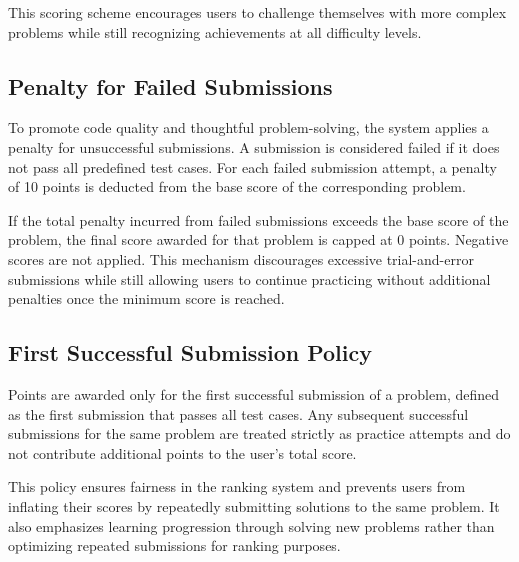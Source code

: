 This scoring scheme encourages users to challenge themselves with more complex problems while still recognizing achievements at all difficulty levels.

\subsection*{Penalty for Failed Submissions}

To promote code quality and thoughtful problem-solving, the system applies a penalty for unsuccessful submissions. A submission is considered failed if it does not pass all predefined test cases. For each failed submission attempt, a penalty of 10 points is deducted from the base score of the corresponding problem.

If the total penalty incurred from failed submissions exceeds the base score of the problem, the final score awarded for that problem is capped at 0 points. Negative scores are not applied. This mechanism discourages excessive trial-and-error submissions while still allowing users to continue practicing without additional penalties once the minimum score is reached.

\subsection*{First Successful Submission Policy}

Points are awarded only for the first successful submission of a problem, defined as the first submission that passes all test cases. Any subsequent successful submissions for the same problem are treated strictly as practice attempts and do not contribute additional points to the user’s total score.

This policy ensures fairness in the ranking system and prevents users from inflating their scores by repeatedly submitting solutions to the same problem. It also emphasizes learning progression through solving new problems rather than optimizing repeated submissions for ranking purposes.
